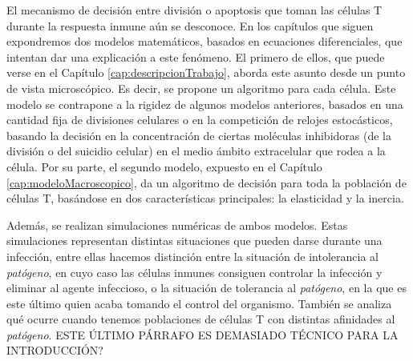 El mecanismo de decisión entre división o apoptosis que toman las células T durante la respuesta inmune aún se desconoce. En los capítulos que siguen expondremos dos modelos matemáticos, basados en ecuaciones diferenciales, que intentan dar una explicación a este fenómeno. El primero de ellos, que puede verse en el Capítulo \ref{cap:descripcionTrabajo}, aborda este asunto desde un punto de vista microscópico. Es decir, se propone un algoritmo para cada célula. Este modelo se contrapone a la rigidez de algunos modelos anteriores, basados en una cantidad fija de divisiones celulares o en la competición de relojes estocásticos, basando la decisión en la concentración de ciertas moléculas inhibidoras (de la división o del suicidio celular) en el medio ámbito extracelular que rodea a la célula. Por su parte, el segundo modelo, expuesto en el Capítulo \ref{cap:modeloMacroscopico}, da un algoritmo de decisión para toda la población de células T, basándose en dos características principales: la elasticidad y la inercia.
 
Además, se realizan simulaciones numéricas de ambos modelos. Estas simulaciones representan distintas situaciones que pueden darse durante una infección, entre ellas hacemos distinción entre la situación de intolerancia al \textit{patógeno}, en cuyo caso las células inmunes consiguen controlar la infección y eliminar al agente infeccioso, o la situación de tolerancia al \textit{patógeno}, en la que es este último quien acaba tomando el control del organismo. También se analiza qué ocurre cuando tenemos poblaciones de células T con distintas afinidades al \textit{patógeno}. ESTE ÚLTIMO PÁRRAFO ES DEMASIADO TÉCNICO PARA LA INTRODUCCIÓN?

